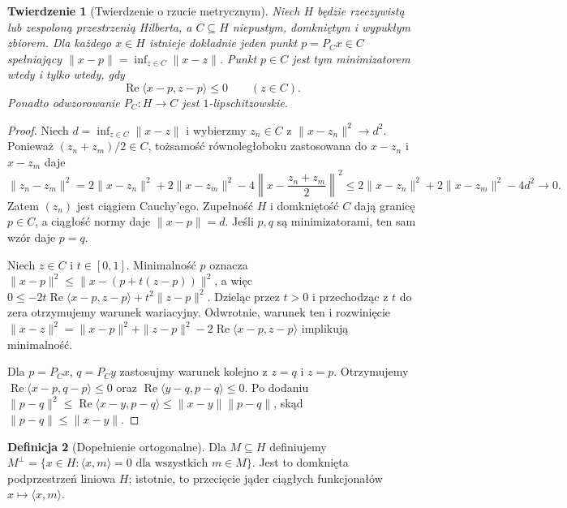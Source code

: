 \documentclass[11pt,a4paper]{article}
\numberwithin{equation}{section}
\theoremstyle{plain}
\newtheorem{twierdzenie}{Twierdzenie}[section]
\theoremstyle{definition}
\newtheorem{definicja}[twierdzenie]{Definicja}
\theoremstyle{remark}
\begin{document}
\begin{twierdzenie}[Twierdzenie o rzucie metrycznym]
\label{thm:projection-convex13}
Niech $H$ będzie rzeczywistą lub zespoloną przestrzenią Hilberta,
a $C\subseteq H$ niepustym, domkniętym i wypukłym zbiorem.
Dla każdego $x\in H$ istnieje dokładnie jeden punkt $p=P_Cx\in C$
spełniający $\|x-p\|=\inf_{z\in C}\|x-z\|$.
Punkt $p\in C$ jest tym minimizatorem wtedy i tylko wtedy, gdy
\[
\operatorname{Re}\langle x-p,z-p\rangle\le0\qquad(z\in C).
\]
Ponadto odwzorowanie $P_C:H\to C$ jest $1$-lipschitzowskie.
\end{twierdzenie}
\begin{proof}
Niech $d=\inf_{z\in C}\|x-z\|$ i wybierzmy $z_n\in C$ z
$\|x-z_n\|^2\to d^2$. Ponieważ $(z_n+z_m)/2\in C$,
tożsamość równoległoboku zastosowana do $x-z_n$ i $x-z_m$ daje
\[
\|z_n-z_m\|^2
=2\|x-z_n\|^2+2\|x-z_m\|^2
-4\left\|x-\frac{z_n+z_m}{2}\right\|^2
\le2\|x-z_n\|^2+2\|x-z_m\|^2-4d^2\longrightarrow0.
\]
Zatem $(z_n)$ jest ciągiem Cauchy'ego. Zupełność $H$ i domkniętość
$C$ dają granicę $p\in C$, a ciągłość normy daje $\|x-p\|=d$.
Jeśli $p,q$ są minimizatorami, ten sam wzór daje $p=q$.

Niech $z\in C$ i $t\in[0,1]$. Minimalność $p$ oznacza
$\|x-p\|^2\le\|x-(p+t(z-p))\|^2$,
a więc
$0\le-2t\operatorname{Re}\langle x-p,z-p\rangle+t^2\|z-p\|^2$.
Dzieląc przez $t>0$ i przechodząc z $t$ do zera otrzymujemy
warunek wariacyjny. Odwrotnie, warunek ten i rozwinięcie
$\|x-z\|^2=\|x-p\|^2+\|z-p\|^2-
2\operatorname{Re}\langle x-p,z-p\rangle$ implikują minimalność.

Dla $p=P_Cx$, $q=P_Cy$ zastosujmy warunek kolejno z $z=q$
i $z=p$. Otrzymujemy
$\operatorname{Re}\langle x-p,q-p\rangle\le0$ oraz
$\operatorname{Re}\langle y-q,p-q\rangle\le0$. Po dodaniu
$\|p-q\|^2\le\operatorname{Re}\langle x-y,p-q\rangle
\le\|x-y\|\|p-q\|$, skąd $\|p-q\|\le\|x-y\|$.
\end{proof}

\begin{definicja}[Dopełnienie ortogonalne]
\label{def:orth-complement13}
Dla $M\subseteq H$ definiujemy
$M^\perp=\{x\in H:\langle x,m\rangle=0\text{ dla wszystkich }m\in M\}$.
Jest to domknięta podprzestrzeń liniowa $H$; istotnie, to
przecięcie jąder ciągłych funkcjonałów $x\mapsto\langle x,m\rangle$.
\end{definicja}
\end{document}
